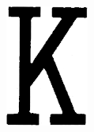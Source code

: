 \documentclass[a4paper,12pt,notitlepage]{article}
\begin{document}
\begin{figure}[H]
\begin{subfigure}[b]{0.15\textwidth}
					\includegraphics[width=\textwidth]{chris/image24}
					\caption{}
				\end{subfigure}
				\begin{subfigure}[b]{0.14\textwidth}
					\centering

\end{subfigure}
\end{figure}
\end{document}
